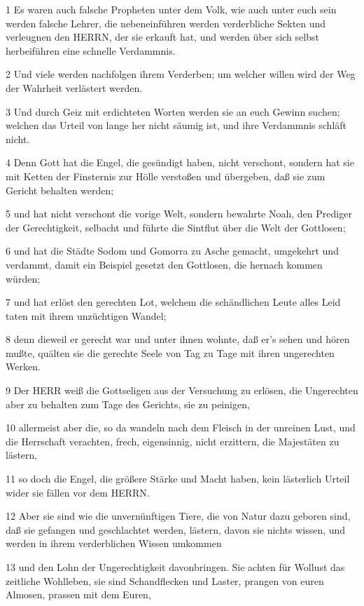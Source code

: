 \par 1 Es waren auch falsche Propheten unter dem Volk, wie auch unter euch sein werden falsche Lehrer, die nebeneinführen werden verderbliche Sekten und verleugnen den HERRN, der sie erkauft hat, und werden über sich selbst herbeiführen eine schnelle Verdammnis.
\par 2 Und viele werden nachfolgen ihrem Verderben; um welcher willen wird der Weg der Wahrheit verlästert werden.
\par 3 Und durch Geiz mit erdichteten Worten werden sie an euch Gewinn suchen; welchen das Urteil von lange her nicht säumig ist, und ihre Verdammnis schläft nicht.
\par 4 Denn Gott hat die Engel, die gesündigt haben, nicht verschont, sondern hat sie mit Ketten der Finsternis zur Hölle verstoßen und übergeben, daß sie zum Gericht behalten werden;
\par 5 und hat nicht verschont die vorige Welt, sondern bewahrte Noah, den Prediger der Gerechtigkeit, selbacht und führte die Sintflut über die Welt der Gottlosen;
\par 6 und hat die Städte Sodom und Gomorra zu Asche gemacht, umgekehrt und verdammt, damit ein Beispiel gesetzt den Gottlosen, die hernach kommen würden;
\par 7 und hat erlöst den gerechten Lot, welchem die schändlichen Leute alles Leid taten mit ihrem unzüchtigen Wandel;
\par 8 denn dieweil er gerecht war und unter ihnen wohnte, daß er's sehen und hören mußte, quälten sie die gerechte Seele von Tag zu Tage mit ihren ungerechten Werken.
\par 9 Der HERR weiß die Gottseligen aus der Versuchung zu erlösen, die Ungerechten aber zu behalten zum Tage des Gerichts, sie zu peinigen,
\par 10 allermeist aber die, so da wandeln nach dem Fleisch in der unreinen Lust, und die Herrschaft verachten, frech, eigensinnig, nicht erzittern, die Majestäten zu lästern,
\par 11 so doch die Engel, die größere Stärke und Macht haben, kein lästerlich Urteil wider sie fällen vor dem HERRN.
\par 12 Aber sie sind wie die unvernünftigen Tiere, die von Natur dazu geboren sind, daß sie gefangen und geschlachtet werden, lästern, davon sie nichts wissen, und werden in ihrem verderblichen Wissen umkommen
\par 13 und den Lohn der Ungerechtigkeit davonbringen. Sie achten für Wollust das zeitliche Wohlleben, sie sind Schandflecken und Laster, prangen von euren Almosen, prassen mit dem Euren,
